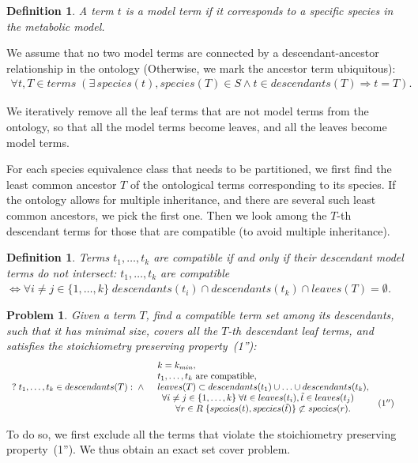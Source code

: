 \documentclass[9pt]{article}
\newcounter{pbm}
\newcounter{def}
\newcounter{rm}
\begin{document}
\newtheorem{mt}[def]{Definition}
\begin{mt}
A term $t$ is a \emph{model term} if it corresponds to a specific species in the metabolic model. 
\end{mt}
We assume that no two model terms are connected by a descendant-ancestor relationship in the ontology (Otherwise, we mark the ancestor term ubiquitous): \\
\[ \begin{array}{c}
\mbox{$\forall t, T \in terms \; (\exists\, species(t), species(T) \in S \land t \in descendants(T) \Rightarrow t = T)$.}
\end{array} \]

We iteratively remove all the leaf terms that are not model terms from the ontology, so that all the model terms become leaves, and all the leaves become model terms. 

For each species equivalence class that needs to be partitioned, we first find the least common ancestor $T$ of the ontological terms corresponding to its species. If the ontology allows for multiple inheritance, and there are several such least common ancestors, we pick the first one. Then we look among the $T$-th descendant terms for those that are compatible (to avoid multiple inheritance).

\newtheorem{comp}[def]{Definition}
\begin{comp}
Terms $ t_1, \ldots, t_k$ are \emph{compatible} if and only if their descendant model terms do not intersect:
$ t_1, \ldots, t_k$ are compatible $\iff \forall i \neq j \in \{1, \ldots, k\} \; descendants(t_i) \cap descendants(t_k) \cap leaves(T) = \emptyset$.
\end{comp}

\newtheorem{pp}[pbm]{Problem}
\begin{pp}
Given a term $T$, find a compatible term set among its descendants, such that it has minimal size, covers all the $T$-th descendant leaf terms, and satisfies the stoichiometry preserving property~(1''):
\[ \begin{array}{ll}
\mbox{$?\; t_1, \ldots, t_k \in descendants(T):\; \land $} & \begin{array}{lr}
	\mbox{$k = k_{min}$},&\\
	\mbox{$t_1, \ldots, t_k$ are compatible,} & \\
	\mbox{$leaves(T) \subset descendants(t_1) \cup \ldots \cup descendants(t_k)$},  & \\
	\begin{array}{l}
	\mbox{$\forall i \neq j \in \{1, \ldots, k\}\;\forall t \in leaves(t_i), \tilde{t} \in leaves(t_j)$} \\
	\indent \mbox{$\forall r \in R \; \{species(t), species(\tilde{t})\} \not \subset species(r)$}.
	\end{array} & (1'')
\end{array}
\end{array} \]

\end{pp}
To do so, we first exclude all the terms that violate the stoichiometry preserving property~(1''). We thus obtain an exact set cover problem.
\end{document}
